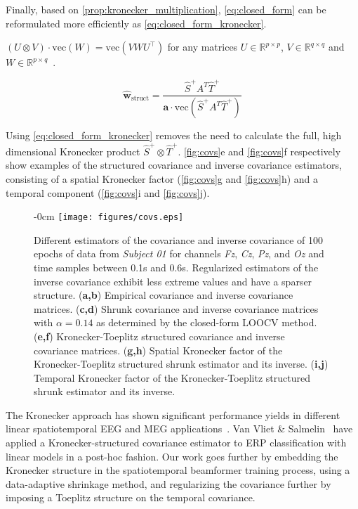 Finally, based on \autoref{prop:kronecker_multiplication},
\autoref{eq:closed_form} can be reformulated more efficiently as
\autoref{eq:closed_form_kronecker}.
\begin{property}
	$(U\otimes V)\cdot\text{vec}(W) = \text{vec}(VWU^\intercal)$
	for any matrices $U\in\mathbb{R}^{p\times p}$,
	$V\in\mathbb{R}^{q\times q}$ and $W\in\mathbb{R}^{p\times q}$~\cite{Loan2000}.
	\label{prop:kronecker_multiplication}
\end{property}

	\begin{equation}
		\hat{\mathbf{w}}_\text{struct} =
		\frac{\hat{S}^+A^T\hat{T}^+}
		{\mathbf{a}\cdot\text{vec}(\hat{S}^+A^T\hat{T}^+)}
		\label{eq:closed_form_kronecker}
	\end{equation}

Using \autoref{eq:closed_form_kronecker} removes the need to calculate the full, high dimensional Kronecker product $\hat{S}^+\otimes
\hat{T}^+$.
\autoref{fig:covs}e and \autoref{fig:covs}f respectively show examples of the
structured covariance and inverse covariance estimators,
consisting of a spatial Kronecker factor (\autoref{fig:covs}g and
\autoref{fig:covs}h) and a temporal component (\autoref{fig:covs}i and
\autoref{fig:covs}j).

\begin{figure}
	\begin{adjustwidth}{-\extralength}{0cm}
		\centering
	\texttt{[image: figures/covs.eps]}
\end{adjustwidth}
	\caption{Different estimators of the covariance and inverse covariance
		of 100 epochs of data from \textit{Subject 01} for channels
\textit{Fz}, \textit{Cz}, \textit{Pz}, and \textit{Oz} and time samples between 0.1s and 0.6s.
Regularized estimators of the inverse covariance exhibit less extreme values and have a sparser structure.
(\textbf{a,b}) Empirical covariance and inverse covariance matrices.
(\textbf{c,d}) Shrunk covariance and inverse covariance matrices with $\alpha=0.14$ as
determined by the closed-form LOOCV method. (\textbf{e,f}) Kronecker-Toeplitz
structured covariance and inverse covariance matrices.
(\textbf{g,h}) Spatial Kronecker factor of the Kronecker-Toeplitz structured shrunk estimator and its inverse.
(\textbf{i,j}) Temporal Kronecker factor of the Kronecker-Toeplitz structured shrunk estimator and its inverse.}
	\label{fig:covs}
\end{figure}
\unskip

The Kronecker approach has shown significant performance yields in different linear spatiotemporal EEG and MEG
applications~\cite{de2002estimating,huizenga2002spatiotemporal,6408231,gonzalez2016kronecker,gonzalez2017spatio}.
Van Vliet \& Salmelin~\cite{Vliet2020} have applied a Kronecker-structured covariance estimator to ERP classification with linear models in a post-hoc fashion.
Our work goes further by embedding the Kronecker structure in the
spatiotemporal beamformer training process, using a data-adaptive shrinkage
method, and regularizing the covariance further by imposing a Toeplitz
structure on the temporal covariance.

